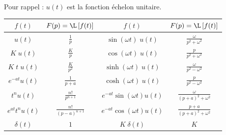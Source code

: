 Pour rappel : $u(t)$ est la fonction échelon unitaire.
\renewcommand\arraystretch{1.3}
\begin{center}
\begin{tabular}{|c|c||c|c|}
	\hline
	$f(t)$			&	$\displaystyle F(p)=\L\left[f(t)\right]$		&	$f(t)$					&	$F(p)=\L\left[f(t)\right]$					\\[0.3cm]
	\hline\hline
	$u(t)$			&	$\displaystyle \frac 1p$				&	$\sin(\omega t)\;u(t)$		&	$\displaystyle \frac{\omega}{p^2+\omega^2}$	\\[0.3cm]
	\hline
	$K\;u(t)$		&	$\displaystyle \frac{K}{p}$			&	$\cos(\omega t)\;u(t)$		&	$\displaystyle \frac{p}{p^2+\omega^2}$		\\[0.3cm]
	\hline
	$K\;t\;u(t)$		&	$\displaystyle \frac K{p^2}$			&	$\sinh(\omega t)\;u(t)$		&	$\displaystyle \frac \omega{p^2-\omega^2}$		\\[0.3cm]
	\hline
	$e^{-at}u(t)$	&	$\displaystyle \frac{1}{p+a}$			&	$\cosh(\omega t)\;u(t)$		&	$\displaystyle \frac{p}{p^2-\omega^2}$		\\[0.3cm]
	\hline
	$t^nu(t)$		&	$\displaystyle \frac{n!}{p^{n+1}}$		&	$e^{-at}\sin(\omega t)u(t)$	&	$\displaystyle \frac \omega{(p+a)^2+\omega^2}$	\\[0.3cm]
	\hline
	$e^{at} t^n u(t)$	&	$\displaystyle \frac{n!}{(p-a)^{n+1}}$		&	$e^{-at}\cos(\omega t) u(t)$	&	$\displaystyle \frac{p+a}{(p+a)^2+\omega^2}$	\\[0.3cm]
	\hline
	$\delta(t)$		&	$1$							&	$K\;\delta(t)$			&	$K$								\\[0.3cm]
	\hline
\end{tabular}
\end{center}
